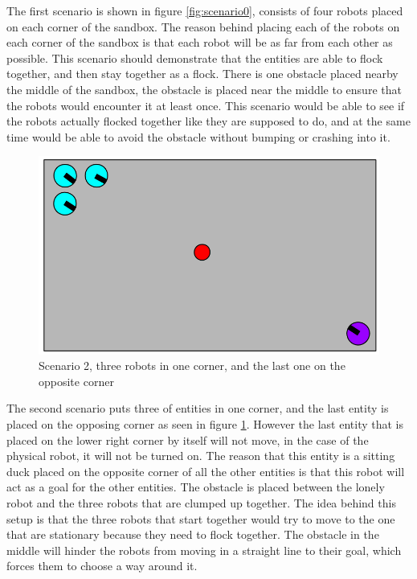 The first scenario is shown in figure \ref{fig:scenario0}, consists of four robots placed on each corner of the sandbox. The reason behind placing each of the robots on each corner of the sandbox is that each robot will be as far from each other as possible. This scenario should demonstrate that the entities are able to flock together, and then stay together as a flock. There is one obstacle placed nearby the middle of the sandbox, the obstacle is placed near the middle to ensure that the robots would encounter it at least once. This scenario would be able to see if the robots actually flocked together like they are supposed to do, and at the same time would be able to avoid the obstacle without bumping or crashing into it.

\begin{figure}[h]
\begin{center}
\includegraphics[width=0.8\linewidth]{figs/scenario1}
\end{center}
\caption[scenario 2]{Scenario 2, three robots in one corner, and the last one on the opposite corner}
\label{fig:scenario1}
\end{figure}

The second scenario puts three of entities in one corner, and the last entity is placed on the opposing corner as seen in figure \ref{fig:scenario1}. However the last entity that is placed on the lower right corner by itself will not move, in the case of the physical robot, it will not be turned on. The reason that this entity is a sitting duck placed on the opposite corner of all the other entities is that this robot will act as a goal for the other entities. The obstacle is placed between the lonely robot and the three robots that are clumped up together. The idea behind this setup is that the three robots that start together would try to move to the one that are stationary because they need to flock together. The obstacle in the middle will hinder the robots from moving in a straight line to their goal, which forces them to choose a way around it. 

